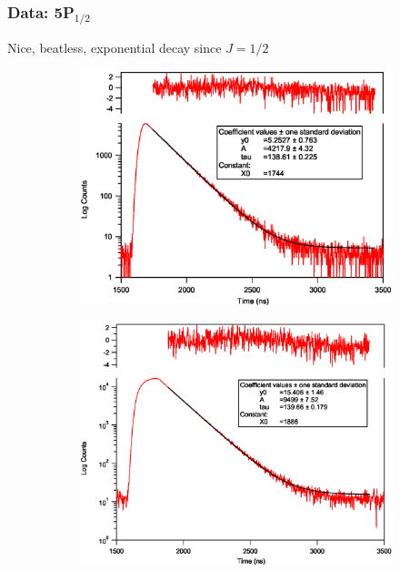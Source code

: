 \documentclass{beamer}
\theoremstyle{definition}
\begin{document}
\begin{frame}
\frametitle{Data: 5P$_{\text{1/2}}$}


Nice, beatless, exponential decay since $J=1/2$





\begin{figure}[!htb]
	\centering
	\hspace{10 pt}
	\begin{subfigure}{0.49\textwidth}
		\includegraphics[width=\textwidth]{p12_70ns_pol.eps}
	\end{subfigure}
	\hspace{-20 pt}
	\begin{subfigure}{0.49\textwidth}
		\includegraphics[width=\textwidth]{p12_200ns_nopolar.eps}
	\end{subfigure}
\end{figure}


\end{frame}
\end{document}
